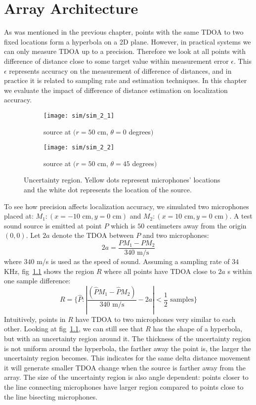 \chapter{Array Architecture}
As was mentioned in the previous chapter, points with the same TDOA to two fixed locations form a hyperbola on a 2D plane. However, in practical systems we can only measure TDOA up to a precision. Therefore we look at all points with difference of distance close to some target value within measurement error $\epsilon$. This $\epsilon$ represents accuracy on the measurement of difference of distances, and in practice it is related to sampling rate and estimation techniques. In this chapter we evaluate the impact of difference of distance estimation on localization accuracy.

\begin{figure}[]
  \centering
  \begin{subfigure}[]{.48\textwidth}
    \texttt{[image: sim/sim\_2\_1]}
    \caption{source at $(r=50$ cm, $\theta = 0$ degrees$)$}
  \end{subfigure}
  \begin{subfigure}[]{.48\textwidth}
    \texttt{[image: sim/sim\_2\_2]}
    \caption{source at $(r=50$ cm, $\theta = 45$ degrees$)$}
  \end{subfigure}
  \caption{Uncertainty region. Yellow dots represent microphones' locations and the white dot represents the location of the source.}
  \label{fig:sim_2_5}
\end{figure}

To see how precision affects localization accuracy, we simulated two microphones placed at: $M_1:(x=-10\mbox{ cm},y=0\mbox{ cm})$ and $M_2:(x=10\mbox{ cm},y=0\mbox{ cm})$. A test sound source is emitted at point $P$ which is $50$ centimeters away from the origin $(0,0)$. Let $2a$ denote the TDOA between $P$ and two microphones:
\[
2a = \frac{P M_1 - P M_2}{340\mbox{ m/s}}
\]
where $340$ m/s is used as the speed of sound. Assuming a sampling rate of $34$ KHz, fig~\ref{fig:sim_2_5} shows the region $R$ where all points have TDOA close to $2a$ s within one sample difference:
\[
R=\{\hat P: |\frac{(\hat P M_1 - \hat P M_2)}{340\mbox{ m/s}} - 2a|< \frac{1}{2} \mbox{ samples}\}
\]
Intuitively, points in $R$ have TDOA to two microphones very similar to each other. Looking at fig~\ref{fig:sim_2_5}, we can still see that $R$ has the shape of a hyperbola, but with an uncertainty region around it. The thickness of the uncertainty region is not uniform around the hyperbola, the farther away the point is, the larger the uncertainty region becomes. This indicates for the same delta distance movement it will generate smaller TDOA change when the source is farther away from the array. The size of the uncertainty region is also angle dependent: points closer to the line connecting microphones have larger region compared to points close to the line bisecting microphones. 

